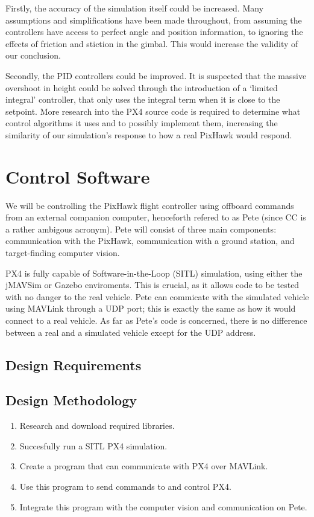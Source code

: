 \documentclass[10pt]{article}
\begin{document}
Firstly, the accuracy of the simulation itself could be increased. Many assumptions and simplifications have been made throughout, from assuming the controllers have access to perfect angle and position information, to ignoring the effects of friction and stiction in the gimbal. This would increase the validity of our conclusion.

Secondly, the PID controllers could be improved. It is suspected that the massive overshoot in height could be solved through the introduction of a `limited integral' controller, that only uses the integral term when it is close to the setpoint. More research into the PX4 source code is required to determine what control algorithms it uses and to possibly implement them, increasing the similarity of our simulation's response to how a real PixHawk would respond.

\section{Control Software}
We will be controlling the PixHawk flight controller using offboard commands from an external companion computer, henceforth refered to as Pete (since CC is a rather ambigous acronym). Pete will consist of three main components: communication with the PixHawk, communication with a ground station, and target-finding computer vision.

PX4 is fully capable of Software-in-the-Loop (SITL) simulation, using either the jMAVSim or Gazebo enviroments. This is crucial, as it allows code to be tested with no danger to the real vehicle. Pete can commicate with the simulated vehicle using MAVLink through a UDP port; this is exactly the same as how it would connect to a real vehicle. As far as Pete's code is concerned, there is no difference between a real and a simulated vehicle except for the UDP address.
\subsection{Design Requirements}
\subsection{Design Methodology}
\begin{enumerate}
    \item Research and download required libraries.
    \item Succesfully run a SITL PX4 simulation.
    \item Create a program that can communicate with PX4 over MAVLink.
    \item Use this program to send commands to and control PX4.
    \item Integrate this program with the computer vision and communication on Pete.
\end{enumerate}
\end{document}
